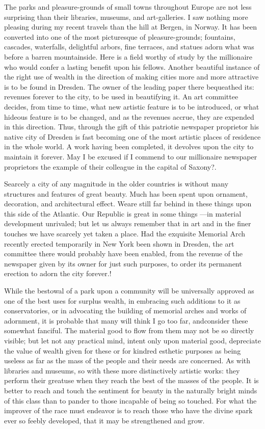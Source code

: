 \documentclass[11pt,openany]{book}
\begin{document}
The parks and pleasure-grounds of small towns throughout Europe are not less surprising than their libraries, museums, and art-galleries. I saw nothing more pleasing during my recent travels than the hill at Bergen, in Norway. It has been converted into one of the most picturesque of pleasure-grounds; fountains, cascades, waterfalls, delightful arbors, fine terraces, and statues adorn what was before a barren mountainside. Here is a field worthy of study by the millionaire who would confer a lasting benefit upon his fellows. Another beautiful instance of the right use of wealth in the direction of making cities more and more attractive is to be found in Dresden. The owner of the leading paper there bequeathed its: revenues forever to the city, to be used in beautifying it. An art committee decides, from time to time, what new artistic feature is to be introduced, or what hideous feature is to be changed, and as the revenues accrue, they are expended in this direction. Thus, through the gift of this patriotie newspaper proprietor his native city of Dresden is fast becoming one of the most artistic places of residence in the whole world. A work having been completed, it devolves upon the city to maintain it forever. May I be excused if I commend to our millionaire newspaper proprietors the example of their colleague in the capital of Saxony?.

Searcely a city of any magnitude in the older countries is without many structures and features of great beauty. Much has been spent upon ornament, decoration, and architectural effect. Weare still far behind in these things upon this side of the Atlantic. Our Republic is great in some things ---in material development unrivaled; but let us always remember that in art and in the finer touches we have scarcely yet taken a place. Had the exquisite Memorial Arch recently erected temporarily in New York been shown in Dresden, the art committee there would probably have been enabled, from the revenue of the newspaper given by its owner for just such purposes, to order its permanent erection to adorn the city forever.!

While the bestowal of a park upon a community will be universally approved as one of the best uses for surplus wealth, in embracing such additions to it as conservatories, or in advocating the building of memorial arches and works of adornment, it is probable that many will think I go too far, andconsider these somewhat fanciful. The material good to flow from them may not be so directly visible; but let not any practical mind, intent only upon material good, depreciate the value of wealth given for these or for kindred esthetic purposes as being useless as far as the mass of the people and their needs are concerned. As with libraries and museums, so with these more distinctively artistic works: they perform their greatuse when they reach the best of the masses of the people. It is better to reach and touch the sentiment for beauty in the naturally bright minds of this class than to pander to those incapable of being so touched. For what the improver of the race must endeavor is to reach those who have the divine spark ever so feebly developed, that it may be strengthened and grow.
\end{document}
